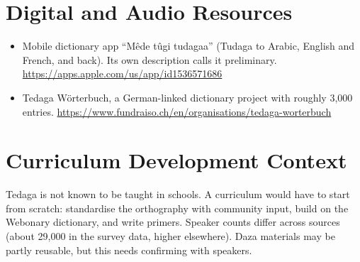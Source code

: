 \documentclass[12pt]{article}
\begin{document}
\section{Digital and Audio Resources}
\begin{itemize}
\item Mobile dictionary app ``M\^ede t\^ugi tudagaa'' (Tudaga to Arabic, English and French, and back). Its own description calls it preliminary. \url{https://apps.apple.com/us/app/id1536571686}
\item Tedaga W\"orterbuch, a German-linked dictionary project with roughly 3,000 entries. \url{https://www.fundraiso.ch/en/organisations/tedaga-worterbuch}
\end{itemize}

\section{Curriculum Development Context}
Tedaga is not known to be taught in schools. A curriculum would have to start from scratch: standardise the orthography with community input, build on the Webonary dictionary, and write primers. Speaker counts differ across sources (about 29,000 in the survey data, higher elsewhere). Daza materials may be partly reusable, but this needs confirming with speakers.
\end{document}
